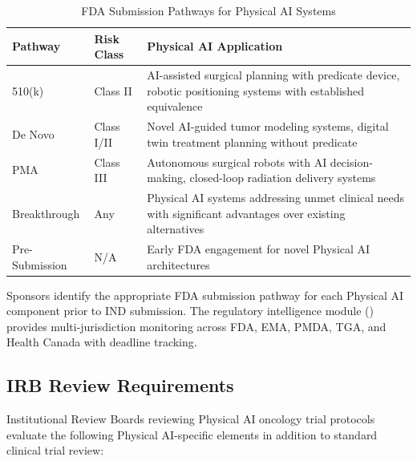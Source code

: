 \documentclass[11pt,letterpaper]{article}
\begin{document}
\begin{table}[H]
\centering
\caption{FDA Submission Pathways for Physical AI Systems}
\small
\begin{tabularx}{\textwidth}{l l X}
\toprule
\textbf{Pathway} & \textbf{Risk Class} & \textbf{Physical AI Application} \\
\midrule
510(k) & Class II & AI-assisted surgical planning with predicate device, robotic positioning systems with established equivalence \\
De Novo & Class I/II & Novel AI-guided tumor modeling systems, digital twin treatment planning without predicate \\
PMA & Class III & Autonomous surgical robots with AI decision-making, closed-loop radiation delivery systems \\
Breakthrough & Any & Physical AI systems addressing unmet clinical needs with significant advantages over existing alternatives \\
Pre-Submission & N/A & Early FDA engagement for novel Physical AI architectures \\
\bottomrule
\end{tabularx}
\end{table}

Sponsors \SHALL{} identify the appropriate FDA submission pathway for each Physical AI component prior to IND submission. The regulatory intelligence module () provides multi-jurisdiction monitoring across FDA, EMA, PMDA, TGA, and Health Canada with deadline tracking.

\subsection{IRB Review Requirements}

Institutional Review Boards reviewing Physical AI oncology trial protocols \SHALL{} evaluate the following Physical AI-specific elements in addition to standard clinical trial review:
\end{document}
